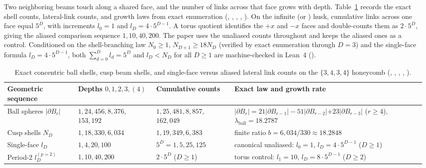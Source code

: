 Two neighboring beams touch along a shared face, and the number of links across that face grows with depth.
Table~\ref{tab:shells} records the exact shell counts, lateral-link counts, and growth laws from exact enumeration
(, , , , ). On the infinite (or
\mbox{}) husk, cumulative links across one face equal $5^D$, with increments $l_0 = 1$ and
$l_D = 4 \cdot 5^{D-1}$. A \mbox{} torus quotient identifies the $+x$ and $-x$ faces and double-counts
them as $2 \cdot 5^D$, giving the aliased comparison sequence $1, 10, 40, 200$. The paper uses the unaliased counts
throughout and keeps the aliased ones as a control. Conditioned on the shell-branching
law $N_0 \ge 1$, $N_{D+1} \ge 18 N_D$ (verified by exact enumeration through $D = 3$) and the single-face formula
$l_D = 4 \cdot 5^{D-1}$, both $\sum_{d=0}^D l_d = 5^D$ and $l_D < N_D$ for all $D \ge 1$ are machine-checked in
Lean~4 ().

\begin{table}[htbp]
\centering
\caption{Exact concentric ball shells, cusp beam shells, and single-face versus aliased \mbox{}
lateral link counts on the $\{3,4,3,4\}$ honeycomb (, , ,
, ).}
\label{tab:shells}
\small
\begin{tabularx}{\textwidth}{@{}>{\raggedright\arraybackslash}p{2.6cm}>{\raggedright\arraybackslash}p{2.9cm}>{\raggedright\arraybackslash}p{2.7cm}>{\raggedright\arraybackslash}X@{}}
\toprule
Geometric sequence & Depths $0, 1, 2, 3, (4)$ & Cumulative counts & Exact law and growth rate \\
\midrule
Ball spheres $|\partial B_r|$ & $1, 24, 456, 8{,}376,$ $153{,}192$ & $1, 25, 481, 8{,}857,$ $162{,}049$ & $|\partial B_r| = 21|\partial B_{r-1}| - 51|\partial B_{r-2}|$\newline $+ 23|\partial B_{r-3}|$ ($r \ge 4$), $\lambda_{\mathrm{ball}} = 18.2787$ \\
\addlinespace[4pt]
Cusp shells $N_D$ & $1, 18, 330, 6{,}034$ & $1, 19, 349, 6{,}383$ & finite ratio $b = 6{,}034/330 \approx 18.2848$ \\
\addlinespace[4pt]
Single-face $l_D$ & $1, 4, 20, 100$ & $5^D = 1, 5, 25, 125$ & canonical unaliased: $l_0 = 1$, $l_D = 4 \cdot 5^{D-1}$ ($D \ge 1$) \\
\addlinespace[4pt]
Period-2 $l_D^{(p=2)}$ & $1, 10, 40, 200$ & $2 \cdot 5^D$ ($D \ge 1$) & torus control: $l_1 = 10$, $l_D = 8 \cdot 5^{D-1}$ ($D \ge 2$) \\
\bottomrule
\end{tabularx}
\end{table}

